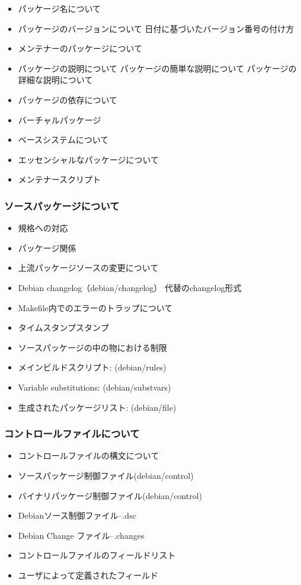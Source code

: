 \documentclass[mingoth,a4paper]{jsarticle}
\begin{document}
\begin{itemize}
        \item パッケージ名について
        \item パッケージのバージョンについて
            日付に基づいたバージョン番号の付け方

        \item メンテナーのパッケージについて
        \item パッケージの説明について
            パッケージの簡単な説明について
            パッケージの詳細な説明について

        \item パッケージの依存について
        \item バーチャルパッケージ
        \item ベースシステムについて
        \item エッセンシャルなパッケージについて
        \item メンテナースクリプト
\end{itemize}

    \subsubsection{ソースパッケージについて}
\begin{itemize}
        \item 規格への対応
        \item パッケージ関係
        \item 上流パッケージソースの変更について
        \item Debian changelog（debian/changelog）
            代替のchangelog形式
        \item Makefile内でのエラーのトラップについて
        \item タイムスタンプスタンプ
        \item ソースパッケージの中の物における制限
        \item メインビルドスクリプト: (debian/rules)
        \item Variable substitutions: (debian/substvars)
        \item 生成されたパッケージリスト: (debian/file)
\end{itemize}

    \subsubsection{コントロールファイルについて}
\begin{itemize}
        \item コントロールファイルの構文について
        \item ソースパッケージ制御ファイル(debian/control)
        \item バイナリパッケージ制御ファイル(debian/control)
        \item Debianソース制御ファイル--.dsc
        \item Debian Change ファイル--.changes
        \item コントロールファイルのフィールドリスト
        \item ユーザによって定義されたフィールド
\end{itemize}
\end{document}
